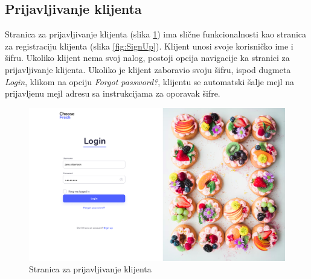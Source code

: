 \subsection{Prijavljivanje klijenta}

Stranica za prijavljivanje klijenta (slika \ref{fig:Login}) ima slične funkcionalnosti kao stranica za registraciju klijenta (slika \ref{fig:SignUp}). Klijent unosi svoje korisničko ime i šifru. Ukoliko klijent nema svoj nalog, postoji opcija navigacije ka stranici za prijavljivanje klijenta. Ukoliko je klijent zaboravio svoju šifru, ispod dugmeta \textit{Login}, klikom na opciju \textit{Forgot password?}, klijentu se automatski šalje mejl na prijavljenu mejl adresu sa instrukcijama za oporavak šifre. 

\begin{figure}[H]
	\begin{center}
		\includegraphics[width=\textwidth]{UI/Login.jpg}
    		\caption{Stranica za prijavljivanje klijenta}
    \label{fig:Login}
    \end{center}
\end{figure}

